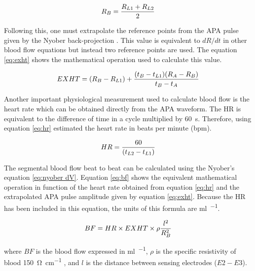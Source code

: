 
\begin{align}
	\label{eq:RB}
	R_B = \frac{R_{L1}+R_{L2}}{2} \tagaddtext{[\si{\Omega}]}
\end{align}

Following this, one must extrapolate the reference points from the APA pulse given by the Nyober back-projection \cite{montgomery2011segmental}. This value is equivalent to $dR/dt$ in other blood flow equations but instead two reference points are used. The equation \ref{eq:exht} shows the mathematical operation used to calculate this value.

\begin{align}
	\label{eq:exht}
	EXHT = (R_{B}-R_{L1}) + \frac{(t_{B}-t_{L1})(R_{A}-R_{B})}{t_{B}-t_{A}} \tagaddtext{[\si{\Omega}]}
\end{align}

Another important physiological measurement used to calculate blood flow is the heart rate which can be obtained directly from the APA waveform. The HR is equivalent to the difference of time in a cycle multiplied by \SI{60}{\second}. Therefore, using equation \ref{eq:hr} estimated the heart rate in beats per minute (\si{bpm}).

\begin{align}
	\label{eq:hr}
	HR = \frac{60}{(t_{L2}-t_{L1})}  \tagaddtext{[\si{bpm}]}
\end{align}

The segmental blood flow beat to beat can be calculated using the Nyober's equation \ref{eq:nyober dV}. Equation \ref{eq:bf} shows the equivalent mathematical operation in function of the heart rate obtained from equation \ref{eq:hr} and the extrapolated APA pulse amplitude given by equation \ref{eq:exht}. Because the HR has been included in this equation, the units of this formula are \si{\milli\litre\per\min}. 

\begin{align}
	\label{eq:bf}
	BF = HR \times EXHT \times \rho \frac{l^2}{R_B^2} \tagaddtext{[\si{\ml\per\min}]}
\end{align}

where $BF$ is the blood flow expressed in \si{\milli\litre\per\min}, $\rho$ is the specific resistivity of blood \SI{150}{\ohm\per\cm} \cite{mohapatra1981non, nyober1950electrical}, and $l$ is the distance between sensing electrodes ($E2 - E3$).

